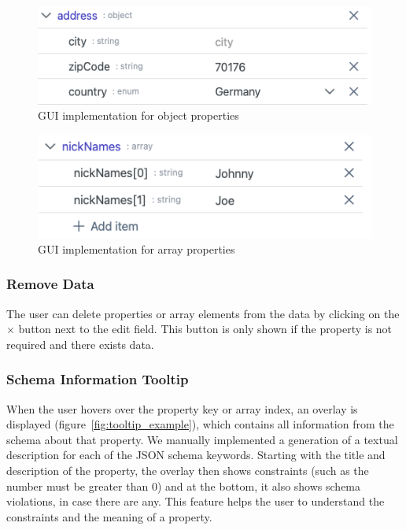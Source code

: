 \begin{figure}[hbt]
    \centering
    \includegraphics[width=\columnwidth]{figures/gui_element_object}
    \caption{GUI implementation for object properties}
    \label{fig:gui_element_object}
\end{figure}


\begin{figure}[hbt]
    \centering
    \includegraphics[width=\columnwidth]{figures/gui_element_array}
    \caption{GUI implementation for array properties}
    \label{fig:gui_element_array}
\end{figure}


\subsubsection{Remove Data}
The user can delete properties or array elements from the data by clicking on the $\times$ button next to the edit field.
This button is only shown if the property is not required and there exists data.

\subsubsection{Schema Information Tooltip}
When the user hovers over the property key or array index, an overlay is displayed (figure~\ref{fig:tooltip_example}), which contains all information from the schema about that property.
We manually implemented a generation of a textual description for each of the JSON schema keywords.
Starting with the title and description of the property, the overlay then shows constraints (such as the number must be greater than 0) and at the bottom, it also shows schema violations, in case there are any.
This feature helps the user to understand the constraints and the meaning of a property.

